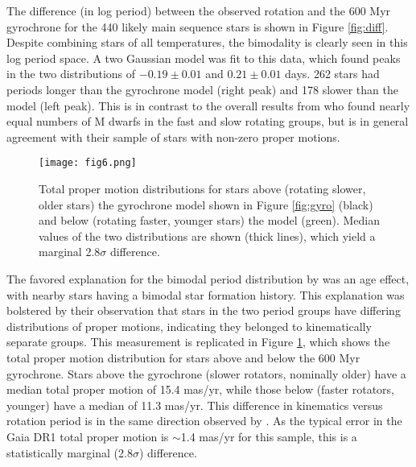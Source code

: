\documentclass[manuscript, letterpaper]{aastex6}
\makeatletter
\let\origsection\section
\renewcommand\section{\@ifstar{\starsection}{\nostarsection}}
\newcommand\nostarsection[1]{\sectionprelude\origsection{#1}}
\newcommand\starsection[1]{\sectionprelude\origsection*{#1}}
\newcommand\sectionprelude{\vspace{1em}}
\makeatother
\begin{document}
The difference (in log period) between the observed rotation and the 600 Myr gyrochrone for the 440 likely main sequence stars is shown in Figure \ref{fig:diff}. Despite combining stars of all temperatures, the bimodality is clearly seen in this log period space. A two Gaussian model was fit to this data, which found peaks in the two distributions of $-0.19 \pm 0.01$ and $0.21 \pm 0.01$ days.  262 stars had periods longer than the gyrochrone model (right peak) and 178 slower than the model (left peak). This is in contrast to the overall results from \citet{mcquillan2013} who found nearly equal numbers of M dwarfs in the fast and slow rotating groups, but is in general agreement with their sample of stars with non-zero proper motions. 




\begin{figure}[]
\centering
\texttt{[image: fig6.png]}
\caption{Total proper motion distributions for stars above (rotating slower, older stars) the gyrochrone model shown in Figure \ref{fig:gyro} (black) and below (rotating faster, younger stars) the model (green). Median values of the two distributions are shown (thick lines), which yield a marginal 2.8$\sigma$ difference.
}
\label{fig:pm}
\end{figure}


The favored explanation for the bimodal period distribution by \citet{mcquillan2013} was an age effect, with nearby stars having a bimodal star formation history. This explanation was bolstered by their observation that stars in the two period groups have differing distributions of proper motions, indicating they belonged to kinematically separate groups. This measurement is replicated in Figure \ref{fig:pm}, which shows the total proper motion distribution for stars above and below the 600 Myr gyrochrone. Stars above the gyrochrone (slower rotators, nominally older) have a median total proper motion of 15.4 mas/yr, while those below (faster rotators, younger)  have a median of 11.3 mas/yr. This difference in kinematics versus rotation period is in the same direction observed by \citet{mcquillan2013}. As the typical error in the  Gaia DR1 total proper motion is $\sim$1.4 mas/yr for this sample, this is a statistically marginal (2.8$\sigma$) difference. 



\section{Discussion}
\end{document}
